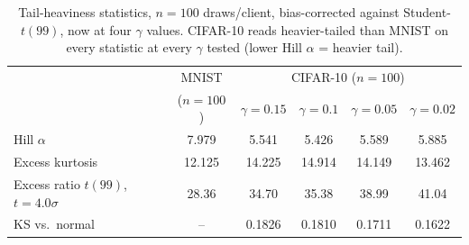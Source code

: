 \documentclass{article}
\begin{document}
\begin{table}[t]
\centering\small
\begin{tabular}{lccccc}
\toprule
 & MNIST & \multicolumn{4}{c}{CIFAR-10 ($n{=}100$)} \\
 & ($n{=}100$) & $\gamma{=}0.15$ & $\gamma{=}0.1$ & $\gamma{=}0.05$ & $\gamma{=}0.02$ \\
\midrule
Hill $\alpha$ & 7.979 & 5.541 & 5.426 & 5.589 & 5.885 \\
Excess kurtosis & 12.125 & 14.225 & 14.914 & 14.149 & 13.462 \\
Excess ratio $t(99)$, $t{=}4.0\sigma$ & 28.36 & 34.70 & 35.38 & 38.99 & 41.04 \\
KS vs.\ normal & -- & 0.1826 & 0.1810 & 0.1711 & 0.1622 \\
\bottomrule
\end{tabular}
\caption{Tail-heaviness statistics, $n{=}100$ draws/client, bias-corrected
against Student-$t(99)$, now at four $\gamma$ values. CIFAR-10 reads
heavier-tailed than MNIST on every statistic at every $\gamma$ tested (lower
Hill $\alpha$ = heavier tail).}
\label{tab:subgauss}
\end{table}
\end{document}
